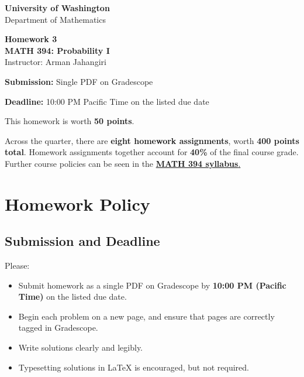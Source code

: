 \documentclass[11pt]{article}
\newcommand{\course}{MATH 394: Probability I}
\newcommand{\department}{Department of Mathematics}
\newcommand{\university}{University of Washington}
\begin{document}
\begin{titlepage}
\centering
\vspace*{1.2cm}

{\Large \textbf{\university}}\\
{\large \department}

\vspace{1.5cm}

{\Huge \color{uwpurple}\textbf{Homework 3}}\\[0.25cm]
{\Large \textbf{\course}}\\[0.25cm]
{\large Instructor: Arman Jahangiri}

\vspace{1cm}

\begin{tcolorbox}[
    width=0.78\textwidth,
    colback=softpurple,
    colframe=uwpurple,
    boxrule=0.9pt,
    arc=3mm
]
\centering
\textbf{Submission:} Single PDF on Gradescope

\textbf{Deadline:} 10:00 PM Pacific Time on the listed due date
\end{tcolorbox}

\vspace{0.8cm}

\begin{tcolorbox}[
    width=0.86\textwidth,
    colback=white,
    colframe=uwgold,
    boxrule=0.8pt,
    arc=3mm
]
This homework is worth \textbf{50 points}.

Across the quarter, there are \textbf{eight homework assignments}, worth \textbf{400 points total}. Homework assignments together account for \textbf{40\%} of the final course grade. Further course policies can be seen in the \href{https://armanjg.github.io/MATH-394-Probability-1-v2/}{\textbf{MATH 394 syllabus}.}
\end{tcolorbox}

\vfill
\end{titlepage}

\section*{Homework Policy}

\subsection*{Submission and Deadline}

Please:

\begin{itemize}[leftmargin=*]
    \item Submit homework as a single PDF on Gradescope by \textbf{10:00 PM (Pacific Time)} on the listed due date.
    \item Begin each problem on a new page, and ensure that pages are correctly tagged in Gradescope.
    \item Write solutions clearly and legibly.
    \item Typesetting solutions in LaTeX is encouraged, but not required.
\end{itemize}
\end{document}
